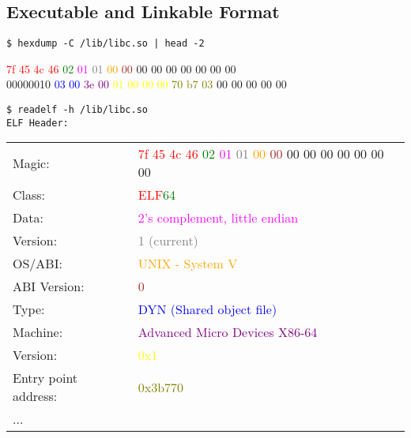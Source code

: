 \documentclass[xga]{xdvislides}
\begin{document}
\subsection{Executable and Linkable Format}
\begin{verbatim}
$ hexdump -C /lib/libc.so | head -2
\end{verbatim}
  \textcolor{red}{7f 45 4c 46} \textcolor{green}{02} \textcolor{magenta}{01} \textcolor{gray}{01} \textcolor{orange}{00} \textcolor{brown}{00} 00 00 00 00 00 00 00 \\
00000010  \textcolor{blue}{03 00} \textcolor{purple}{3e 00} \textcolor{yellow}{01 00 00 00}  \textcolor{olive}{70 b7 03} 00 00 00 00 00
\begin{verbatim}
$ readelf -h /lib/libc.so
ELF Header:
\end{verbatim}
\begin{tabular}{ll}
Magic: & \textcolor{red}{7f 45 4c 46} \textcolor{green}{02} \textcolor{magenta}{01} \textcolor{gray}{01} \textcolor{orange}{00} \textcolor{brown}{00} 00 00 00 00 00 00 00 \\
Class: & \textcolor{red}{ELF}\textcolor{green}{64}\space \\
Data: & \textcolor{magenta}{2's complement, little endian} \\
Version: & \textcolor{gray}{1 (current)} \\
OS/ABI: & \textcolor{orange}{UNIX - System V} \\
ABI Version: & \textcolor{brown}{0} \\
Type: & \textcolor{blue}{DYN (Shared object file)} \\
Machine: & \textcolor{purple}{Advanced Micro Devices X86-64} \\
Version: & \textcolor{yellow}{0x1} \\
Entry point address: & \textcolor{olive}{0x3b770} \\
  ... & \\
\end{tabular}
\setfontphv
\end{document}
